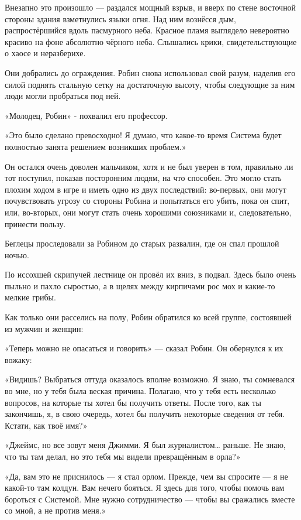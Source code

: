 \documentclass[a4paper,12pt]{book}
\begin{document}
\par
Внезапно это произошло — раздался мощный взрыв, и вверх по стене восточной стороны здания взметнулись языки огня. Над ним вознёсся дым, распростёршийся вдоль пасмурного неба. Красное пламя выглядело невероятно красиво на фоне абсолютно чёрного неба. Слышались крики, свидетельствующие о хаосе и неразберихе.
\par
Они добрались до ограждения. Робин снова использовал свой разум, наделив его силой поднять стальную сетку на достаточную высоту, чтобы следующие за ним люди могли пробраться под ней.
\par
«Молодец, Робин» - похвалил его профессор.
\par
«Это было сделано превосходно! Я думаю, что какое-то время Система будет полностью занята решением возникших проблем.»
\par
Он остался очень доволен мальчиком, хотя и не был уверен в том, правильно ли тот поступил, показав посторонним людям, на что способен. Это могло стать плохим ходом в игре и иметь одно из двух последствий: во-первых, они могут почувствовать угрозу со стороны Робина и попытаться его убить, пока он спит, или, во-вторых, они могут стать очень хорошими союзниками и, следовательно, принести пользу.
\par
Беглецы проследовали за Робином до старых развалин, где он спал прошлой ночью.
\par
По иссохшей скрипучей лестнице он провёл их вниз, в подвал. Здесь было очень пыльно и пахло сыростью, а в щелях между кирпичами рос мох и какие-то мелкие грибы.
\par
Как только они расселись на полу, Робин обратился ко всей группе, состоявшей из мужчин и женщин:
\par
«Теперь можно не опасаться и говорить» — сказал Робин. Он обернулся к их вожаку:
\par
«Видишь? Выбраться оттуда оказалось вполне возможно. Я знаю, ты сомневался во мне, но у тебя была веская причина. Полагаю, что у тебя есть несколько вопросов, на которые ты хотел бы получить ответы. После того, как ты закончишь, я, в свою очередь, хотел бы получить некоторые сведения от тебя. Кстати, как твоё имя?»
\par
«Джеймс, но все зовут меня Джимми. Я был журналистом… раньше. Не знаю, что ты там делал, но это тебя мы видели превращённым в орла?»
\par
«Да, вам это не приснилось — я стал орлом. Прежде, чем вы спросите — я не какой-то там колдун. Вам нечего бояться. Я здесь для того, чтобы помочь вам бороться с Системой. Мне нужно сотрудничество — чтобы вы сражались вместе со мной, а не против меня.»
\end{document}
